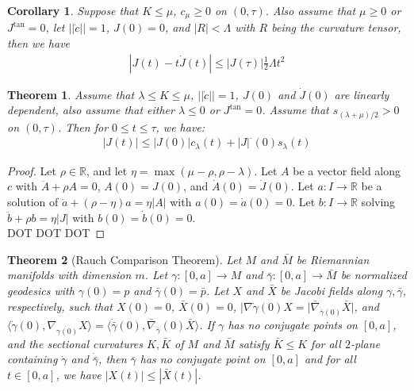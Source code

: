 \documentclass[11pt]{book}
\theoremstyle{break}
\theoremstyle{break}
\newtheorem{thm}{Theorem}[section]
\newtheorem{corT}[lem]{Corollary}
\newcommand{\R}{\mathbb{R}}
\begin{document}
\begin{corT}
Suppose that $K \leq \mu$, $c_\mu\geq 0$ on $(0,\tau)$. Also assume that $\mu \geq 0$ or $J^{\tan} = 0$, let $||\dot{c}|| = 1$, $J(0) = 0$, and $|R|< \Lambda$ with $R$ being the curvature tensor, then we have 
\begin{align*}
|J(t) - t \dot{J}(t) | \leq |J(\tau) | \frac{1}{2}\Lambda t^2
\end{align*}
\end{corT}


\begin{thm}
Assume that $\lambda \leq K\leq \mu$, $||\dot{c}|| = 1$, $J(0)$ and $\dot{J}(0)$ are linearly dependent, also assume that either $\lambda \leq 0$ or $J^{\tan} = 0$. Assume that $s_{(\lambda +\mu)/2} >0$ on $(0,\tau)$. Then for $0\leq t \leq \tau$, we have:
\begin{align*}
|J(t)| \leq |J(0)|c_\lambda(t) + |J|^{\cdot}(0) s_\lambda(t)
\end{align*}
\end{thm}
\begin{proof}
Let $\rho \in \R$, and let $\eta = \max(\mu -\rho, \rho-\lambda)$. Let $A$ be a vector field along $c$ with $\ddot{A} + \rho A = 0$, $A(0) = J(0)$, and $\dot{A}(0) = \dot{J}(0)$. Let $a:I \to \R$ be a solution of $\ddot{a} + (\rho - \eta) a = \eta|A|$ with $a(0) = \dot{a}(0) = 0$. Let $b:I \to \R$ solving $\ddot{b} + \rho b = \eta|J|$ with $b(0) = \dot{b}(0) = 0$. \\

DOT DOT DOT
\end{proof}

\begin{thm}[Rauch Comparison Theorem]
Let $M$ and $\bar{M}$ be Riemannian manifolds with dimension $m$. Let $\gamma:[0,a] \to M$ and $\bar{\gamma}:[0,a] \to \bar{M}$ be normalized geodesics with $\gamma(0) = p$ and $\bar{\gamma}(0) = \bar{p}$. Let $X$ and $\bar{X}$ be Jacobi fields along $\gamma,\bar{\gamma}$, respectively, such that $X(0) = 0$, $\bar{X}(0) = 0$, $|\nabla{\dot{\gamma}(0)}X = |\bar{\nabla}_{\dot{\bar{\gamma}}(0)}\bar{X}|$, and $\langle \dot{\gamma}(0), \nabla_{\dot{\gamma(0)}}X \rangle = \langle \dot{\bar{\gamma}}(0), \bar{\nabla}_{\dot{\bar{\gamma}}}(0) \bar{X}\rangle$. If $\gamma$ has no conjugate points on $[0,a]$, and the sectional curvatures $K,\bar{K}$ of $M$ and $\bar{M}$ satisfy $\bar{K}\leq K$ for all $2$-plane containing $\dot{\gamma}$ and $\dot{\bar{\gamma}}$, then $\bar{\gamma}$ has no conjugate point on $[0,a]$ and for all $t \in [0,a]$, we have $|X(t)| \leq |\bar{X}(t)|$. 
\end{thm}
\end{document}
